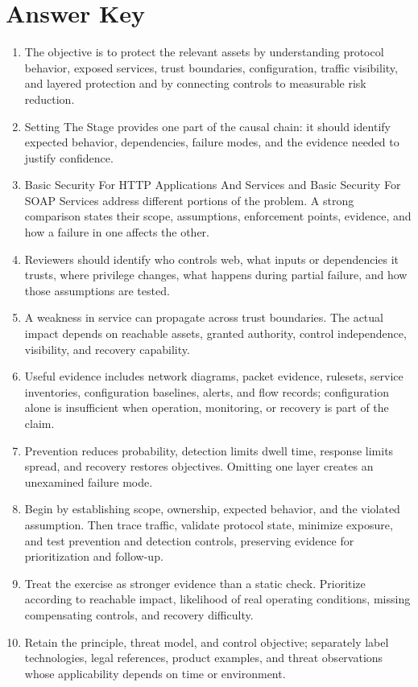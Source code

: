 \documentclass[11pt,letterpaper]{article}
\begin{document}
\section*{Answer Key}
\begin{enumerate}
\item The objective is to protect the relevant assets by understanding protocol behavior, exposed services, trust boundaries, configuration, traffic visibility, and layered protection and by connecting controls to measurable risk reduction.
\item Setting The Stage provides one part of the causal chain: it should identify expected behavior, dependencies, failure modes, and the evidence needed to justify confidence.
\item Basic Security For HTTP Applications And Services and Basic Security For SOAP Services address different portions of the problem. A strong comparison states their scope, assumptions, enforcement points, evidence, and how a failure in one affects the other.
\item Reviewers should identify who controls web, what inputs or dependencies it trusts, where privilege changes, what happens during partial failure, and how those assumptions are tested.
\item A weakness in service can propagate across trust boundaries. The actual impact depends on reachable assets, granted authority, control independence, visibility, and recovery capability.
\item Useful evidence includes network diagrams, packet evidence, rulesets, service inventories, configuration baselines, alerts, and flow records; configuration alone is insufficient when operation, monitoring, or recovery is part of the claim.
\item Prevention reduces probability, detection limits dwell time, response limits spread, and recovery restores objectives. Omitting one layer creates an unexamined failure mode.
\item Begin by establishing scope, ownership, expected behavior, and the violated assumption. Then trace traffic, validate protocol state, minimize exposure, and test prevention and detection controls, preserving evidence for prioritization and follow-up.
\item Treat the exercise as stronger evidence than a static check. Prioritize according to reachable impact, likelihood of real operating conditions, missing compensating controls, and recovery difficulty.
\item Retain the principle, threat model, and control objective; separately label technologies, legal references, product examples, and threat observations whose applicability depends on time or environment.
\end{enumerate}
\end{document}
